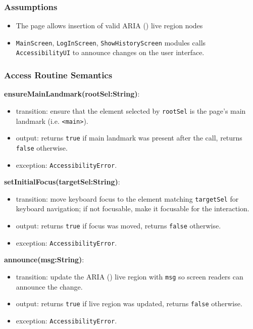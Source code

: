 \documentclass[12pt, titlepage]{article}
\begin{document}
\subsubsection{Assumptions}

\begin{itemize}
  \item The page allows insertion of valid ARIA (\citet{ARIA}) live region nodes
  \item \texttt{MainScreen}, \texttt{LogInScreen},
    \texttt{ShowHistoryScreen} modules calls \texttt{AccessibilityUI}
    to announce changes on the user interface.
\end{itemize}

\subsubsection{Access Routine Semantics}

\noindent \textbf{ensureMainLandmark(rootSel:String)}:
\begin{itemize}
  \item transition: ensure that the element selected by
    \texttt{rootSel} is the page’s
    main landmark (i.e. \texttt{<main>}).
  \item output: returns \texttt{true} if main landmark was present
    after the call, returns \texttt{false}
    otherwise.
  \item exception: \texttt{AccessibilityError}.
\end{itemize}

\noindent \textbf{setInitialFocus(targetSel:String)}:
\begin{itemize}
  \item transition: move keyboard focus to the element matching
    \texttt{targetSel} for keyboard navigation;
    if not focusable, make it focusable for the interaction.
  \item output: returns \texttt{true} if focus was moved, returns \texttt{false}
    otherwise.
  \item exception: \texttt{AccessibilityError}.
\end{itemize}

\noindent \textbf{announce(msg:String)}:
\begin{itemize}
  \item transition: update the ARIA (\citet{ARIA}) live region with \texttt{msg}
    so screen readers can announce the change.
  \item output: returns \texttt{true} if live region was updated,
    returns \texttt{false}
    otherwise.
  \item exception: \texttt{AccessibilityError}.
\end{itemize}
\end{document}
